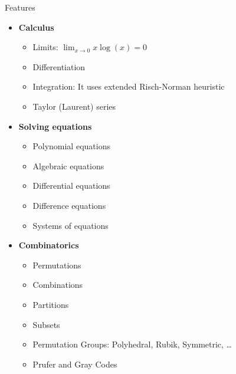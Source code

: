 \documentclass[xcolor=svgnames]{beamer}
\begin{document}
\begin{frame}{Features}
\begin{multicols}{2}
\begin{itemize}
\begin{itemize}
        \end{itemize}
      \item \textbf{Calculus}
        \begin{itemize}
          \tiny
        \item Limits: $\lim_{x\to 0}{x\log(x)} = 0$
        \item Differentiation
        \item Integration: It uses extended Risch-Norman heuristic
        \item Taylor (Laurent) series
        \end{itemize}
      \item \textbf{Solving equations}
        \begin{itemize}
          \tiny
        \item Polynomial equations
        \item Algebraic equations
        \item Differential equations
        \item Difference equations
        \item Systems of equations
        \end{itemize}
      \item \textbf{Combinatorics}
        \begin{itemize}
          \tiny
        \item Permutations
        \item Combinations
        \item Partitions
        \item Subsets
        \item Permutation Groups: Polyhedral, Rubik, Symmetric, \ldots
        \item Prufer and Gray Codes
        \end{itemize}

      \end{itemize}
    \end{multicols}
  \end{frame}
\end{document}
